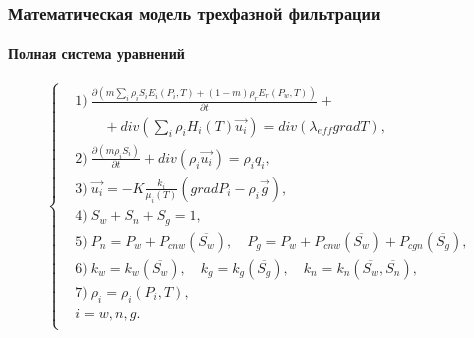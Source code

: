 \begin{frame}
\begin{center}
\frametitle{Математическая модель трехфазной фильтрации}
\framesubtitle{Полная система уравнений}
\begin{equation*}
\left\{
  \begin{aligned}
    & \text{1)}\ \frac{\partial \left(m {\sum\limits_{i}{\rho_i S_i E_i(P_i, T)}} + (1-m){\rho_r E_r(P_w, T)}\right)}{\partial t} + \\
    & \qquad + div(\sum_{i}{\rho_i H_i(T) \overrightarrow{u_i}}) = div(\lambda_{eff} grad T),\\
    & \text{2)}\ \frac{\partial (m \rho_i S_i)}{\partial t}+ div(\rho_i \overrightarrow{u_i}) = \rho_i q_i,\\
    & \text{3)}\ \overrightarrow{u_i}=-K \frac{k_i}{{\mu_i(T)}}(grad P_i - {\rho}_i\overrightarrow{g}),\\
    & \text{4)}\ S_w + S_n + S_g=1,\\
    & \text{5)}\ P_n=P_w+P_{cnw}(\overline{S_w}),\quad P_g=P_w+P_{cnw}(\overline{S_w})+P_{cgn}(\overline{S_g}),\\
    & \text{6)}\ k_w=k_w(\overline{S_w}),\quad k_g=k_g(\overline{S_g}),\quad k_n=k_n(\overline{S_w},\overline{S_n}),\\
    & \text{7)}\ \rho_i=\rho_i(P_i,T),\\
    &i=w,n,g. \\
  \end{aligned}
\right.
\end{equation*}
\end{center}
\end{frame}

